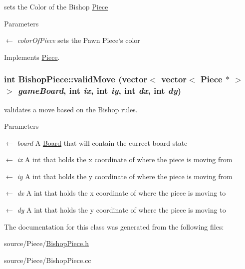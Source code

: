 sets the Color of the Bishop \hyperlink{classPiece}{Piece} 
\begin{DoxyParams}{Parameters}
\item[\mbox{$\leftarrow$} {\em colorOfPiece}]sets the Pawn Piece`s color \end{DoxyParams}


Implements \hyperlink{classPiece_a1387cb503dca308ac1e3bbe38a70a073}{Piece}.\hypertarget{classBishopPiece_a0f0ed53268ba4b42c9e95a92a183d19d}{
\subsubsection[{validMove}]{\setlength{\rightskip}{0pt plus 5cm}int BishopPiece::validMove (vector$<$ vector$<$ {\bf Piece} $\ast$ $>$ $>$ {\em gameBoard}, \/  int {\em ix}, \/  int {\em iy}, \/  int {\em dx}, \/  int {\em dy})}}
\label{classBishopPiece_a0f0ed53268ba4b42c9e95a92a183d19d}


validates a move based on the Bishop rules. 
\begin{DoxyParams}{Parameters}
\item[\mbox{$\leftarrow$} {\em board}]A \hyperlink{classBoard}{Board} that will contain the currect board state \item[\mbox{$\leftarrow$} {\em ix}]A int that holds the x coordinate of where the piece is moving from \item[\mbox{$\leftarrow$} {\em iy}]A int that holds the y coordinate of where the piece is moving from \item[\mbox{$\leftarrow$} {\em dx}]A int that holds the x coordinate of where the piece is moving to \item[\mbox{$\leftarrow$} {\em dy}]A int that holds the y coordinate of where the piece is moving to \end{DoxyParams}


The documentation for this class was generated from the following files:\begin{DoxyCompactItemize}
\item 
source/Piece/\hyperlink{BishopPiece_8h}{BishopPiece.h}\item 
source/Piece/BishopPiece.cc\end{DoxyCompactItemize}
